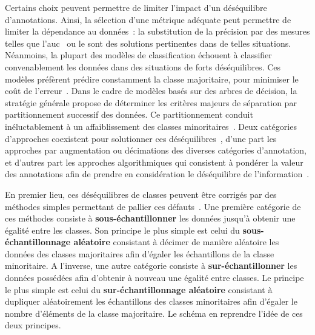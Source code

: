 Certains choix peuvent permettre de limiter l'impact d'un déséquilibre d'annotations. Ainsi, la sélection d'une métrique adéquate peut permettre de limiter la dépendance au données~: la substitution de la précision par des mesures telles que l'\gls{auc}~\cite{Celebi2007} ou le \fscore{} sont des solutions pertinentes dans de telles situations. Néanmoins, la plupart des modèles de classification échouent à classifier convenablement les données dans des situations de forts déséquilibres. Ces modèles préfèrent prédire constamment la classe majoritaire, pour minimiser le coût de l'erreur~\cite{Huang2013}. Dans le cadre de modèles basés sur des arbres de décision, la stratégie générale propose de déterminer les critères majeurs de séparation par partitionnement successif des données. Ce partitionnement conduit inéluctablement à un affaiblissement des classes minoritaires~\cite{He2009}. Deux catégories d'approches coexistent pour solutionner ces déséquilibres~\cite{Huang2013}, d'une part les approches par augmentation ou décimations des diverses catégories d'annotation, et d'autres part les approches algorithmiques qui consistent à pondérer la valeur des annotations afin de prendre en considération le déséquilibre de l'information~\cite{Ting2002,He2009,Thai2010}.\par

En premier lieu, ces déséquilibres de classes peuvent être corrigés par des méthodes simples permettant de pallier ces défauts~\cite{Prati2009, He2009}. Une première catégorie de ces méthodes consiste à \textbf{sous-échantillonner} les données jusqu'à obtenir une égalité entre les classes. Son principe le plus simple est celui du \textbf{sous-échantillonnage aléatoire} consistant à décimer de manière aléatoire les données des classes majoritaires afin d'égaler les échantillons de la classe minoritaire. A l'inverse, une autre catégorie consiste à \textbf{sur-échantillonner} les données possédées afin d'obtenir à nouveau une égalité entre classes. Le principe le plus simple est celui du \textbf{sur-échantillonnage aléatoire} consistant à dupliquer aléatoirement les échantillons des classes minoritaires afin d'égaler le nombre d'éléments de la classe majoritaire. Le schéma en  reprendre l'idée de ces deux principes.\par

